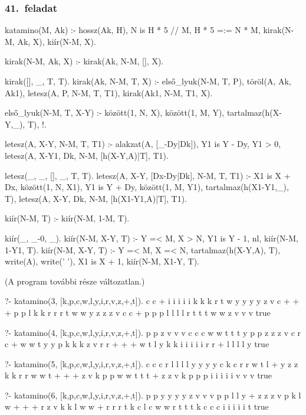 \subsubsection*{41.~feladat}
\begin{program}
katamino(M, Ak) :-
    hossz(Ak, H), N is H * 5 // M,
    H * 5 =:= N * M,
    kirak(N-M, Ak, X), kiír(N-M, X).

kirak(N-M, Ak, X) :- kirak(Ak, N-M, [], X).

kirak([], _, T, T).
kirak(Ak, N-M, T, X) :-
    első_lyuk(N-M, T, P),
    töröl(A, Ak, Ak1),
    letesz(A, P, N-M, T, T1),
    kirak(Ak1, N-M, T1, X).

első_lyuk(N-M, T, X-Y) :-
    között(1, N, X), között(1, M, Y),
    \+ tartalmaz(h(X-Y,_), T), !.

letesz(A, X-Y, N-M, T, T1) :-
    alakzat(A, [_-Dy|Dk]),
    Y1 is Y - Dy, Y1 > 0,
    letesz(A, X-Y1, Dk, N-M, [h(X-Y,A)|T], T1).

letesz(_, _, [], _, T, T).
letesz(A, X-Y, [Dx-Dy|Dk], N-M, T, T1) :-
    X1 is X + Dx, között(1, N, X1),
    Y1 is Y + Dy, között(1, M, Y1),
    \+ tartalmaz(h(X1-Y1,_), T),
    letesz(A, X-Y, Dk, N-M, [h(X1-Y1,A)|T], T1).

kiír(N-M, T) :- kiír(N-M, 1-M, T).

kiír(_, _-0, _).
kiír(N-M, X-Y, T) :-
    Y =< M, X > N, Y1 is Y - 1, nl,
    kiír(N-M, 1-Y1, T).
kiír(N-M, X-Y, T) :-
    Y =< M, X =< N,
    tartalmaz(h(X-Y,A), T),
    write(A), write(' '),
    X1 is X + 1,
    kiír(N-M, X1-Y, T).
\end{program}
(A program további része változatlan.)
\begin{query}
?- katamino(3, [k,p,c,w,l,y,i,r,v,z,+,t]).
c c + i i i i i k k k r t w y y y y z v 
c + + + p p l k k r r r t w w y z z z v 
c c + p p p l l l l r t t t w w z v v v 
true 

?- katamino(4, [k,p,c,w,l,y,i,r,v,z,+,t]).
p p z v v v c c c w w t t t y 
p p z z z v c r c + w w t y y 
p k k k z v r r + + + w t l y 
k k i i i i i r r + l l l l y 
true 

?- katamino(5, [k,p,c,w,l,y,i,r,v,z,+,t]).
c c c r l l l l y y y y 
c k c r r w t l + y z z 
k k r r w w t + + + z v 
k p p w w t t t + z z v 
k p p p i i i i i v v v 
true 

?- katamino(6, [k,p,c,w,l,y,i,r,v,z,+,t]).
p p y y y y z v v v 
p p l l y + z z z v 
p k l w + + + r z v 
k k l w w + r r r t 
k c l c w w r t t t 
k c c c i i i i i t 
true 
\end{query}
